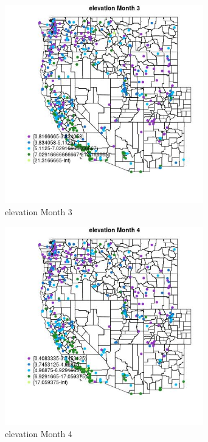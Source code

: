 \begin{figure} 
\centering  
\includegraphics[width=0.77\textwidth]{Code_Outputs/ML_input_report_ML_input_PM25_Step5_part_d_de_duplicated_aves_ML_input_MapObsMo3elevation.jpg} 
\caption{\label{fig:ML_input_report_ML_input_PM25_Step5_part_d_de_duplicated_aves_ML_inputMapObsMo3elevation}elevation Month 3} 
\end{figure} 
 

\clearpage 

\begin{figure} 
\centering  
\includegraphics[width=0.77\textwidth]{Code_Outputs/ML_input_report_ML_input_PM25_Step5_part_d_de_duplicated_aves_ML_input_MapObsMo4elevation.jpg} 
\caption{\label{fig:ML_input_report_ML_input_PM25_Step5_part_d_de_duplicated_aves_ML_inputMapObsMo4elevation}elevation Month 4} 
\end{figure} 
 

